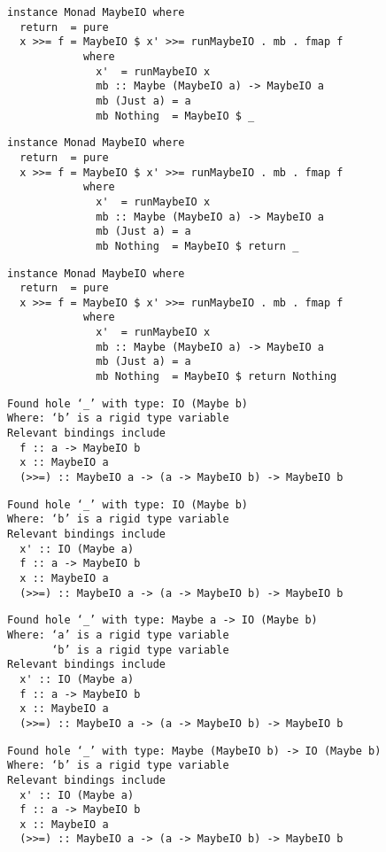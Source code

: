 \documentclass{beamer}
\begin{document}
\begin{frame}[fragile]
\begin{overprint}
\begin{verbatim}
instance Monad MaybeIO where
  return  = pure
  x >>= f = MaybeIO $ x' >>= runMaybeIO . mb . fmap f
            where
              x'  = runMaybeIO x
              mb :: Maybe (MaybeIO a) -> MaybeIO a
              mb (Just a) = a
              mb Nothing  = MaybeIO $ _
\end{verbatim}
\begin{verbatim}
instance Monad MaybeIO where
  return  = pure
  x >>= f = MaybeIO $ x' >>= runMaybeIO . mb . fmap f
            where
              x'  = runMaybeIO x
              mb :: Maybe (MaybeIO a) -> MaybeIO a
              mb (Just a) = a
              mb Nothing  = MaybeIO $ return _
\end{verbatim}
\begin{verbatim}
instance Monad MaybeIO where
  return  = pure
  x >>= f = MaybeIO $ x' >>= runMaybeIO . mb . fmap f
            where
              x'  = runMaybeIO x
              mb :: Maybe (MaybeIO a) -> MaybeIO a
              mb (Just a) = a
              mb Nothing  = MaybeIO $ return Nothing
\end{verbatim}
\end{overprint}
\bigskip
\scriptsize
\begin{overprint}
\begin{verbatim}
Found hole ‘_’ with type: IO (Maybe b)
Where: ‘b’ is a rigid type variable
Relevant bindings include
  f :: a -> MaybeIO b
  x :: MaybeIO a
  (>>=) :: MaybeIO a -> (a -> MaybeIO b) -> MaybeIO b
\end{verbatim}
\begin{verbatim}
Found hole ‘_’ with type: IO (Maybe b)
Where: ‘b’ is a rigid type variable
Relevant bindings include
  x' :: IO (Maybe a)
  f :: a -> MaybeIO b
  x :: MaybeIO a
  (>>=) :: MaybeIO a -> (a -> MaybeIO b) -> MaybeIO b
\end{verbatim}
\begin{verbatim}
Found hole ‘_’ with type: Maybe a -> IO (Maybe b)
Where: ‘a’ is a rigid type variable
       ‘b’ is a rigid type variable
Relevant bindings include
  x' :: IO (Maybe a)
  f :: a -> MaybeIO b
  x :: MaybeIO a
  (>>=) :: MaybeIO a -> (a -> MaybeIO b) -> MaybeIO b
\end{verbatim}
\begin{verbatim}
Found hole ‘_’ with type: Maybe (MaybeIO b) -> IO (Maybe b)
Where: ‘b’ is a rigid type variable
Relevant bindings include
  x' :: IO (Maybe a)
  f :: a -> MaybeIO b
  x :: MaybeIO a
  (>>=) :: MaybeIO a -> (a -> MaybeIO b) -> MaybeIO b

\end{verbatim}
\end{overprint}
\end{frame}
\end{document}
